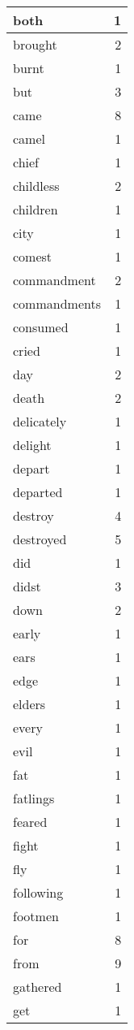 \begin{center}
\begin{longtable}{l|r}
both & 1 \\ \hline
brought & 2 \\ \hline
burnt & 1 \\ \hline
but & 3 \\ \hline
came & 8 \\ \hline
camel & 1 \\ \hline
chief & 1 \\ \hline
childless & 2 \\ \hline
children & 1 \\ \hline
city & 1 \\ \hline
comest & 1 \\ \hline
commandment & 2 \\ \hline
commandments & 1 \\ \hline
consumed & 1 \\ \hline
cried & 1 \\ \hline
day & 2 \\ \hline
death & 2 \\ \hline
delicately & 1 \\ \hline
delight & 1 \\ \hline
depart & 1 \\ \hline
departed & 1 \\ \hline
destroy & 4 \\ \hline
destroyed & 5 \\ \hline
did & 1 \\ \hline
didst & 3 \\ \hline
down & 2 \\ \hline
early & 1 \\ \hline
ears & 1 \\ \hline
edge & 1 \\ \hline
elders & 1 \\ \hline
every & 1 \\ \hline
evil & 1 \\ \hline
fat & 1 \\ \hline
fatlings & 1 \\ \hline
feared & 1 \\ \hline
fight & 1 \\ \hline
fly & 1 \\ \hline
following & 1 \\ \hline
footmen & 1 \\ \hline
for & 8 \\ \hline
from & 9 \\ \hline
gathered & 1 \\ \hline
get & 1 \\ \hline

\end{longtable}
\end{center}
